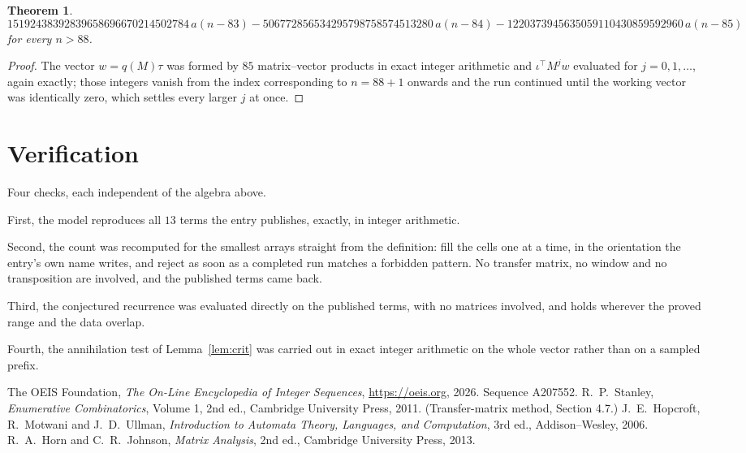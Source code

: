 \documentclass[11pt,a4paper]{article}
\theoremstyle{plain}
\newtheorem{theorem}{Theorem}
\theoremstyle{definition}
\begin{document}
\begin{theorem}
\[15192438392839658696670214502784\,a(n-83) - 506772856534295798758574513280\,a(n-84) - 1220373945635059110430859592960\,a(n-85)
\]
for every $n>88$.
\end{theorem}

\begin{proof}
The vector $w=q(M)\tau$ was formed by $85$ matrix--vector products in exact integer
arithmetic and $\iota^{\!\top}M^{j}w$ evaluated for $j=0,1,\dots$, again exactly; those
integers vanish from the index corresponding to $n=88+1$ onwards and the run continued
until the working vector was identically zero, which settles every larger $j$ at once.
\end{proof}

\section{Verification}

Four checks, each independent of the algebra above.

First, the model reproduces all $13$ terms the entry publishes, exactly, in integer
arithmetic.

Second, the count was recomputed for the smallest arrays straight from the definition: fill the
cells one at a time, in the orientation the entry's own name writes, and reject as soon as a
completed run matches a forbidden pattern. No transfer matrix, no window and no transposition
are involved, and the published terms came back.

Third, the conjectured recurrence was evaluated directly on the published terms, with no
matrices involved, and holds wherever the proved range and the data overlap.

Fourth, the annihilation test of Lemma~\ref{lem:crit} was carried out in exact integer
arithmetic on the whole vector rather than on a sampled prefix.

\begin{thebibliography}{9}
 The OEIS Foundation, \emph{The On-Line Encyclopedia of Integer
Sequences}, \url{https://oeis.org}, 2026. Sequence A207552.
 R.~P.~Stanley, \emph{Enumerative Combinatorics}, Volume 1, 2nd ed.,
Cambridge University Press, 2011. (Transfer-matrix method, Section 4.7.)
 J.~E.~Hopcroft, R.~Motwani and J.~D.~Ullman, \emph{Introduction to Automata
Theory, Languages, and Computation}, 3rd ed., Addison--Wesley, 2006.
 R.~A.~Horn and C.~R.~Johnson, \emph{Matrix Analysis}, 2nd ed., Cambridge
University Press, 2013.
\end{thebibliography}
\end{document}

